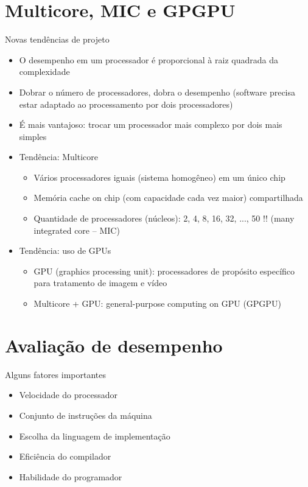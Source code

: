 \section[slide=false]{Multicore, MIC e GPGPU}
\begin{slide}[toc=]{Novas tendências de projeto}
	\begin{itemize}
		\item O desempenho em um processador é proporcional à raiz quadrada da complexidade\pause
		\item Dobrar o número de processadores, dobra o desempenho (software precisa estar adaptado ao processamento por dois processadores)\pause
		\item É mais vantajoso: trocar um processador mais complexo por dois mais simples\pause
		\item Tendência: Multicore 
			\begin{itemize}
				\item Vários processadores iguais (sistema homogêneo) em um único chip\pause
				\item Memória cache on chip (com capacidade cada vez maior) compartilhada\pause
				\item Quantidade de processadores (núcleos): 2, 4, 8, 16, 32, ..., 50 !! (many integrated core -- MIC)\pause
			\end{itemize}
		\item Tendência: uso de GPUs
			\begin{itemize}
				\item GPU (graphics processing unit): processadores de propósito específico para tratamento de imagem e vídeo\pause
				\item Multicore + GPU: general-purpose computing on GPU (GPGPU)
			\end{itemize}
	\end{itemize}
\end{slide}


\section[slide=false]{Avaliação de desempenho}
\begin{slide}{Alguns fatores importantes}
\begin{itemize}
   \item Velocidade do processador
   \item Conjunto de instruções da máquina
   \item Escolha da linguagem de implementação
   \item Eficiência do compilador
   \item Habilidade do programador
\end{itemize}
\end{slide}


